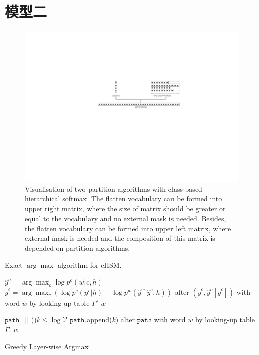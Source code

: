 \documentclass[master,openright,twoside,color]{buaathesis}
\begin{document}
\section{模型二}
\begin{figure}[!t]
  \centering
\includegraphics[width=0.85\linewidth]{./figures/chsm-simple.pdf}
\caption{Visualisation of two partition algorithms with class-based hierarchical softmax. The flatten vocabulary can be formed into upper right matrix, where the size of matrix should be greater or equal to the vocabulary and no external mask is needed.
Besides, the flatten vocabulary can be formed into upper left matrix, where external mask is needed and the composition of this matrix is depended on partition algorithms.}\label{fig:chsm}
\end{figure}
\begin{algorithm}[t]
\caption{Exact $\arg\max$ algorithm for cHSM.}\label{alog:exact}
 $\hat y^o=\arg\max_o{\log p^o(w| c,h)}$ 
 $\tilde y^c=\arg\max_c{(\log p^c(y^c|h)+\log p^w(\hat y^w|\hat y^c,h))}$
 alter $(\tilde y^c,\hat y^o[\tilde y^c])$ with word $w$ by looking-up table $\Gamma'$ \;
 \Return $w$ \;
\end{algorithm}



\begin{algorithm}[t]
\SetAlgoLined
{}
 $\mathtt{path}$=[] \;
\While(){$k \le \log \mathcal{V}$ }{
 $\mathtt{path}$.append($k$) 
}
 alter $\mathtt{path}$ with word $w$ by looking-up table $\Gamma$.\;
 \Return $w$ \;
\caption{Greedy Layer-wise Argmax}\label{alog:greed_argmax}
\end{algorithm}
\end{document}
